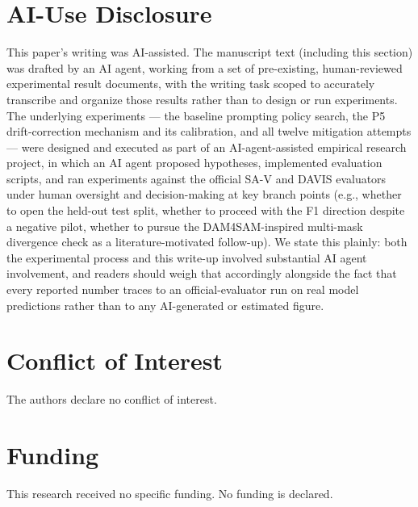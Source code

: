 \documentclass[11pt]{article}
\begin{document}
\section*{AI-Use Disclosure}

This paper's writing was AI-assisted. The manuscript text (including this section) was drafted by an AI agent, working from a set of pre-existing, human-reviewed experimental result documents, with the writing task scoped to accurately transcribe and organize those results rather than to design or run experiments. The underlying experiments — the baseline prompting policy search, the P5 drift-correction mechanism and its calibration, and all twelve mitigation attempts — were designed and executed as part of an AI-agent-assisted empirical research project, in which an AI agent proposed hypotheses, implemented evaluation scripts, and ran experiments against the official SA-V and DAVIS evaluators under human oversight and decision-making at key branch points (e.g., whether to open the held-out test split, whether to proceed with the F1 direction despite a negative pilot, whether to pursue the DAM4SAM-inspired multi-mask divergence check as a literature-motivated follow-up). We state this plainly: both the experimental process and this write-up involved substantial AI agent involvement, and readers should weigh that accordingly alongside the fact that every reported number traces to an official-evaluator run on real model predictions rather than to any AI-generated or estimated figure.

\section*{Conflict of Interest}

The authors declare no conflict of interest.

\section*{Funding}

This research received no specific funding. No funding is declared.



\end{document}
